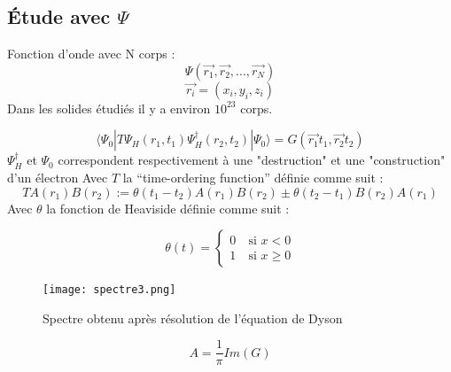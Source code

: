 \documentclass{beamer}
\begin{document}

\subsection{\'Etude avec $\Psi$}



\begin{frame}
Fonction d'onde avec N corps :
\begin{equation}
 \Psi(\vec{r_1}, \vec{r_2}, ..., \vec{r_N})
\end{equation}
\begin{equation}
 \vec{r_i} = (x_i, y_i, z_i)
\end{equation}
Dans les solides \'etudi\'es il y a environ $10^{23}$ corps.
\end{frame}







\begin{frame}
 \begin{equation}
 \langle \Psi_0 | T \Psi_H (r_1, t_1) \Psi_H^\dagger (r_2, t_2) | \Psi_0 \rangle = G(\vec{r_1} t_1, \vec{r_2}  t_2)
\end{equation}
$\Psi_H^\dagger$ et $\Psi_0$ correspondent respectivement à une "destruction" et une "construction" d'un \'electron
Avec $T$ la ``time-ordering function'' d\'efinie comme suit :
\begin{equation}
 T{A(r_1)B(r_2)} := \theta(t_1 - t_2)A(r_1)B(r_2) \pm \theta(t_2 - t_1)B(r_2) A(r_1)
\end{equation}
Avec $\theta$ la fonction de Heaviside d\'efinie comme suit :

\begin{equation}
\theta(t) = 
\left\{ \begin{array}{rl}
 0 &\ \text{si }x <0\\
 1 &\ \text{si }x \geq 0
\end{array} \right.
\end{equation}


\end{frame}


\begin{frame}
 \begin{figure}
\caption{Spectre obtenu apr\`es r\'esolution de l'\'equation de Dyson}
\texttt{[image: spectre3.png]}
\label{solb}
\end{figure}
\begin{equation}
 A = \frac{1}{\pi}Im(G)
\end{equation}
\end{frame}
\end{document}
